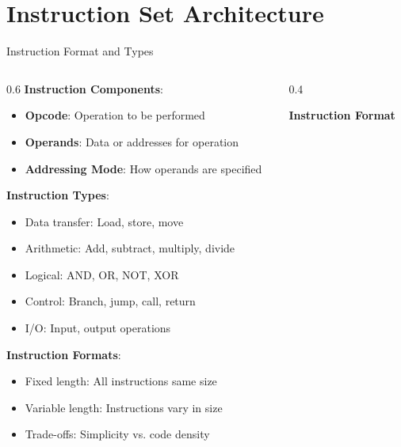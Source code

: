 \documentclass[aspectratio=169]{beamer}
\newcommand{\concept}[1]{\textbf{\color{darkblue}#1}}
\begin{document}
\section{Instruction Set Architecture}

\begin{frame}{Instruction Format and Types}
\begin{columns}
\begin{column}{0.6\textwidth}
\concept{Instruction Components}:
\begin{itemize}
\item \textbf{Opcode}: Operation to be performed
\item \textbf{Operands}: Data or addresses for operation
\item \textbf{Addressing Mode}: How operands are specified
\end{itemize}

\vspace{0.3cm}
\concept{Instruction Types}:
\begin{itemize}
\item Data transfer: Load, store, move
\item Arithmetic: Add, subtract, multiply, divide
\item Logical: AND, OR, NOT, XOR
\item Control: Branch, jump, call, return
\item I/O: Input, output operations
\end{itemize}

\vspace{0.3cm}
\concept{Instruction Formats}:
\begin{itemize}
\item Fixed length: All instructions same size
\item Variable length: Instructions vary in size
\item Trade-offs: Simplicity vs. code density
\end{itemize}
\end{column}
\begin{column}{0.4\textwidth}
\begin{center}
\textbf{Instruction Format}
\vspace{0.3cm}

\end{center}
\end{column}
\end{columns}
\end{frame}
\end{document}
